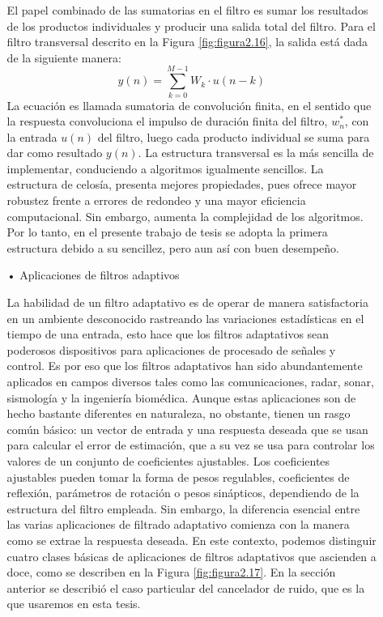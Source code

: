 \begin{enumerate}
\begin{enumerate}
\vskip 0.5cm
El papel combinado de las sumatorias en el filtro es sumar los resultados de los productos individuales y producir una salida total del filtro. Para el filtro transversal descrito en la Figura \ref{fig:figura2.16}, la salida está dada de la siguiente manera:
\begin{equation}
\label{eq:ecuacion8}
y(n) = \sum_{k=0}^{M-1}W_{k} \cdot u(n-k)
\end{equation}
La ecuación es llamada sumatoria de convolución finita, en el sentido que la respuesta convoluciona el impulso de duración finita del filtro, $w^{*}_{n}$, con la entrada $u(n)$ del filtro, luego cada producto individual se suma para dar como resultado $y(n)$.
\vskip 0.5cm
La estructura transversal es la más sencilla de implementar, conduciendo a algoritmos igualmente sencillos. La estructura de celosía, presenta mejores propiedades, pues ofrece mayor robustez frente a errores de redondeo y una mayor eficiencia computacional. Sin embargo, aumenta la complejidad de los algoritmos. Por lo tanto, en el presente trabajo de tesis se adopta la primera estructura debido a su sencillez, pero aun así con buen desempeño.

\item[•]Aplicaciones de filtros adaptivos
\par
La habilidad de un filtro adaptativo es de operar de manera satisfactoria en un ambiente desconocido rastreando las variaciones estadísticas en el tiempo de una entrada, esto hace que los filtros adaptativos sean poderosos dispositivos para aplicaciones de procesado de señales y control. Es por eso que los filtros adaptativos han sido abundantemente aplicados en campos diversos tales como las comunicaciones, radar, sonar, sismología y la ingeniería biomédica. Aunque estas aplicaciones son de hecho bastante diferentes en naturaleza, no obstante, tienen un rasgo común básico: un vector de entrada y una respuesta deseada que se usan para calcular el error de estimación, que a su vez se usa para controlar los valores de un conjunto de coeficientes ajustables. 
\newpage
Los coeficientes ajustables pueden tomar la forma de pesos regulables, coeficientes de reflexión, parámetros de rotación o pesos sinápticos, dependiendo de la estructura del filtro empleada. Sin embargo, la diferencia esencial entre las varias aplicaciones de filtrado adaptativo comienza con la manera como se extrae la respuesta deseada. 
\vskip 0.5cm
En este contexto, podemos distinguir cuatro clases básicas de aplicaciones de filtros adaptativos que ascienden a doce, como se describen en la Figura \ref{fig:figura2.17}. En la sección anterior se describió el caso particular del cancelador de ruido, que es la que usaremos en esta tesis.


\end{enumerate}
\end{enumerate}
